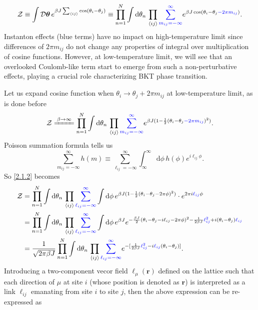 \documentclass[10pt,nofootinbib]{revtex4}
\newcommand*\dd{\mathop{}\!\mathrm{d}}
\def\Z{\mathcal{Z}}
\begin{document}
		\begin{equation}\label{2.1.1}
			\Z\equiv\int\mathcal{D}\bm{\theta}\,e^{\beta J\sum_{\langle ij \rangle }\cos(\theta_i-\theta_j)}\equiv\prod_{n=1}^N\int\dd\theta_n\,\prod_{\langle ij \rangle }{\color{blue}\sum_{m_{ij}=-\infty}^\infty}e^{\beta J\cos(\theta_i-\theta_j{\color{blue}-2\pi m_{ij}})}.
		\end{equation}
		Instanton effects (blue terms) have no impact on high-temperature limit since differences of $2\pi m_{ij}$ do not change any properties of integral over multiplication of cosine functions. However, at low-temperature limit, we will see that an overlooked Coulomb-like term start to emerge from such a non-perturbative effects, playing a crucial role characterizing BKT phase transition.\par
		Let us expand cosine function when $\theta_i \rightarrow \theta_j+2\pi m_{ij}$ at low-temperature limit, as is done before
		\begin{equation}\label{2.1.2}
			\Z\xlongequal{\beta\rightarrow\infty}\prod_{n=1}^N\int\dd\theta_n\,\prod_{\langle ij \rangle }{\color{blue}\sum_{m_{ij}=-\infty}^\infty}e^{\beta J(1-\frac{1}{2}(\theta_i-\theta_j{\color{blue}-2\pi m_{ij}})^2)}.
		\end{equation}
		Poisson summation formula tells us
		\begin{equation}\label{2.1.3}
			\sum_{m_{ij}=-\infty}^\infty h(m)\equiv\sum_{\ell_{ij}=-\infty}^\infty\int_\infty^\infty\dd\phi\,h(\phi)e^{i\ell_{ij}\phi}.
		\end{equation}
		So \eqref{2.1.2} becomes
		\begin{align*}
			\Z&=\prod_{n=1}^N\int\dd\theta_n\,\prod_{\langle ij \rangle }{\color{blue}\sum_{\ell_{ij}=-\infty}^\infty}\int\dd\phi\,e^{\beta J(1-\frac{1}{2}(\theta_i-\theta_j-2\pi\phi)^2)}\cdot e^{2\pi i{\color{blue}\ell_{ij}}\phi}\\
			&=\prod_{n=1}^N\int\dd\theta_n\,\prod_{\langle ij \rangle }{\color{blue}\sum_{\ell_{ij}=-\infty}^\infty}\int\dd\phi\,e^{\beta J}e^{-\frac{\beta J}{2}(\theta_i-\theta_j-i\ell_{ij}-2\pi\phi)^2-\frac{1}{2\beta J}{\color{blue}\ell_{ij}^2}+i(\theta_i-\theta_j){\color{blue}\ell_{ij}}}\\
			&=\dfrac{1}{\sqrt{2\pi\beta J}}\prod_{n=1}^N\int\dd\theta_n\,\prod_{\langle ij \rangle }{\color{blue}\sum_{\ell_{ij}=-\infty}^\infty}e^{-[\frac{1}{2\beta J}{\color{blue}\ell_{ij}^2}-i{\color{blue}\ell_{ij}}(\theta_i-\theta_j)]}.
		\end{align*}
		Introducing a two-component vecor field $\ell_\mu(\bm{r})$ defined on the lattice such that each direction of $\mu$ at site $i$ (whose position is denoted as $\bm{r}$) is interpreted as a link $\ell_{ij}$ emanating from site $i$ to site $j$, then the above expression can be re-expressed as
\end{document}
